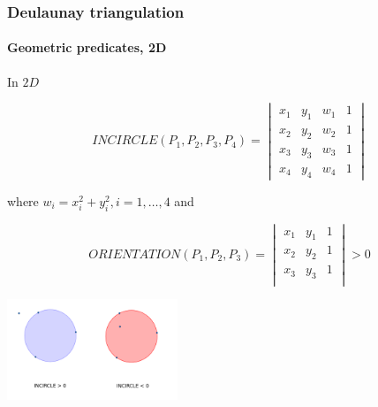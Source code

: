 \documentclass[c, 10pt]{beamer}
\begin{document}
\begin{frame}\frametitle{Deulaunay triangulation}\framesubtitle{Geometric predicates, 2D}
\begin{small}
In $2D$

$$INCIRCLE(P_1,P_2,P_3,P_4) = \begin{vmatrix} x_1 & y_1 & w_1 & 1 \\
x_2 & y_2 & w_2 & 1 \\
x_3 & y_3 &  w_3 & 1 \\
x_4 & y_4 &  w_4 & 1\end{vmatrix}$$

where $w_i = x_i^2  + y_i^2, i = 1,\dots, 4$ and 

$$ORIENTATION(P_1,P_2,P_3) = 
\begin{vmatrix} 
x_1 & y_1 & 1 \\
x_2 & y_2 & 1 \\
x_3 & y_3 & 1 \\
\end{vmatrix} > 0$$
\end{small}

\begin{center}
\includegraphics[height = 3cm]{./FigureLayout/Incircle.png}
\end{center}

\end{frame}
\end{document}
